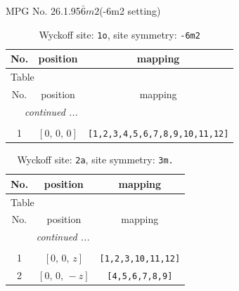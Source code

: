 \documentclass[fleqn,8pt]{jsarticle}
\begin{document}
\setcounter{MaxMatrixCols}{32}

\renewcommand{\tablename}{Table~}
\renewcommand{\figurename}{Figure~}
\begin{center}
\LARGE
MPG No. 26.1.95\quad$\bar{6}m2$\quad(-6m2 setting)
\end{center}
\renewcommand{\arraystretch}{1.2}
\begin{longtable}{ccc}
\caption{Wyckoff site: {\tt 1o}, site symmetry: {\tt -6m2}}
 \\
 \hline \hline
No. & position & mapping \\ \hline \endfirsthead

\multicolumn{2}{l}{\tablename\ \thetable{}} \\
 \hline \hline
No. & position & mapping \\ \hline \endhead

 \hline \hline
\multicolumn{2}{r}{\footnotesize\it continued ...} \\ \endfoot

 \hline \hline
\multicolumn{2}{r}{} \\ \endlastfoot

1 & $\left[ 0,\, 0,\, 0 \right]$ & {\tt [1,2,3,4,5,6,7,8,9,10,11,12]} \\
\end{longtable}
\renewcommand{\arraystretch}{1.2}
\begin{longtable}{ccc}
\caption{Wyckoff site: {\tt 2a}, site symmetry: {\tt 3m.}}
 \\
 \hline \hline
No. & position & mapping \\ \hline \endfirsthead

\multicolumn{2}{l}{\tablename\ \thetable{}} \\
 \hline \hline
No. & position & mapping \\ \hline \endhead

 \hline \hline
\multicolumn{2}{r}{\footnotesize\it continued ...} \\ \endfoot

 \hline \hline
\multicolumn{2}{r}{} \\ \endlastfoot

1 & $\left[ 0,\, 0,\, z \right]$ & {\tt [1,2,3,10,11,12]} \\ \hline
2 & $\left[ 0,\, 0,\, - z \right]$ & {\tt [4,5,6,7,8,9]} \\
\end{longtable}
\renewcommand{\arraystretch}{1.2}
\end{document}
